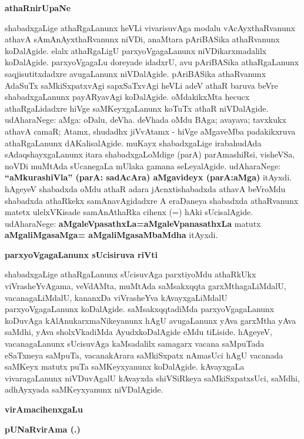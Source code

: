 \newpage

\smallskip
\begin{center}
\textbf{athaRnirUpaNe}
\end{center}
\smallskip

shabadxgaLige athaRgaLanunx heVLi vivarisuvAga modalu vAcAyxthaRvanunx athavA sAmAnAyxthaRvanunx niVDi, anaMtara pAriBASika athaRvanunx koDalAgide. elalx athaRgaLigU parxyoVgagaLanunx niVDikarxmadalilx koDalAgide. parxyoVgagaLu doreyade idadxrU, avu pAriBASika athaRgaLanunx saqjisutitxdadxre avugaLanunx niVDalAgide. pAriBASika athaRvanunx AdaSuTx saMkiSxpatxvAgi sapxSaTxvAgi heVLi adeV athaR baruva beVre shabadxgaLanunx payARyavAgi koDalAgide. oMdakikxMta hecucx athaRgaLidadxre  hiVge saMKeyxgaLanunx koTuTx athaR niVDalAgide. udAharaNege: aMga:  oDalu, deVha.  deVhada oMdu BAga; avayava;  tavxkukx athavA camaR;  Atamx,  shudadhx jiVvAtamx - hiVge aMgaveMba padakikxruva  athaRgaLanunx dAKalisalAgide. muKayx shabadxgaLige irabahudAda sAdaqshayxgaLanunx itara shabadxgaLoMdige (parA) parAmashiRsi, visheVSa, noVDi muMtAda sUcanegaLa mUlaka gamana seLeyalAgide. udAharaNege: \textbf{``aMkurashiVla'' (parA: sadAcAra) aMgavideyx (parA:aMga)} itAyxdi. hAgeyeV shabadxda oMdu athaR adara jAcnxtishabadxda athavA beVroMdu shabadxda athaRkekx samAnavAgidadxre A eraDaneya shabadxda athaRvanunx matetx ulelxVKisade samAnAthaRka cihenx (=) hAki sUcisalAgide. udAharaNege: \textbf{aMgaleVpasathxLa=aMgaleVpanasathxLa} matutx \textbf{aMgaliMgasaMga= aMgaliMgasaMbaMdha} itAyxdi.

\smallskip
\begin{center}
\textbf{parxyoVgagaLanunx sUcisiruva riVti}
\end{center}
\smallskip

shabadxgaLige athaRgaLanunx sUcisuvAga parxtiyoMdu athaRkUkx viVrasheYvAgama, veVdAMta, muMtAda saMsakxqqta garxMthagaLiMdalU, vacanagaLiMdalU, kananxDa viVrasheYva kAvayxgaLiMdalU parxyoVgagaLanunx koDalAgide. saMsakxqqtadiMda parxyoVgagaLanunx koDuvAga kAlAnukarxmaNikeyanunx hAgU avugaLanunx yAva garxMtha yAva saMdhi, yAva sholxVkadiMda AyudxkoDalAgide eMdu tiLiside. hAgeyeV, vacanagaLanunx sUcisuvAga kaMsadalilx samagarx vacana saMpuTada eSaTxneya saMpuTa, vacanakArara saMkiSxpatx nAmasUci hAgU vacanada saMKeyx matutx puTa saMKeyxyanunx koDalAgide. kAvayxgaLa vivaragaLanunx niVDuvAgalU kAvayxda shiVSiRkeya saMkiSxpatxsUci, saMdhi, adhAyxyada saMKeyxyanunx niVDalAgide.

\smallskip
\begin{center}
\textbf{virAmacihenxgaLu}

\smallskip

\textbf{pUNaRvirAma (.)}
\end{center}
\smallskip

